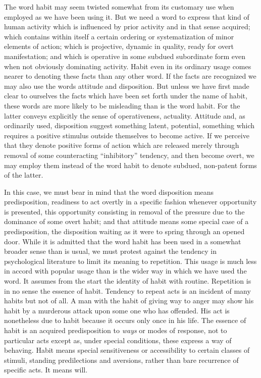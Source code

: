 \documentclass[12pt]{article}
\begin{document}
The word habit may seem twisted somewhat from
its customary use when employed as we have been using
it. But we need a word to express that kind of human
activity which is influenced by prior activity and in
that sense acquired; which contains within itself a certain
ordering or systematization of minor elements of
action; which is projective, dynamic in quality, ready
for overt manifestation; and which is operative in some
subdued subordinate form even when not obviously
dominating activity. Habit even in its ordinary usage
comes nearer to denoting these facts than any other
word. If the facts are recognized we may also use the
words attitude and disposition. But unless we have
first made clear to ourselves the facts which have been
set forth under the name of habit, these words are more
likely to be misleading than is the word habit. For the
latter conveys explicitly the sense of operativeness,
actuality. Attitude and, as ordinarily used, disposition
suggest something latent, potential, something which
requires a positive stimulus outside themselves to become
active. If we perceive that they denote positive
forms of action which are released merely through
removal of some counteracting ``inhibitory'' tendency,
and then become overt, we may employ them instead of
the word habit to denote subdued, non-patent forms of
the latter.

In this case, we must bear in mind that the word
disposition means predisposition, readiness to act
overtly in a specific fashion whenever opportunity is
presented, this opportunity consisting in removal of
the pressure due to the dominance of some overt habit;
and that attitude means some special case of a predisposition,
the disposition waiting as it were to spring
through an opened door. While it is admitted that the
word habit has been used in a somewhat broader sense
than is usual, we must protest against the tendency in
psychological literature to limit its meaning to repetition.
This usage is much less in accord with popular
usage than is the wider way in which we have used the
word. It assumes from the start the identity of habit
with routine. Repetition is in no sense the essence of
habit. Tendency to repeat acts is an incident of many
habits but not of all. A man with the habit of giving
way to anger may show his habit by a murderous attack
upon some one who has offended. His act is nonetheless
due to habit because it occurs only once in his life.
The essence of habit is an acquired predisposition to
\emph{ways} or modes of response, not to particular acts except
as, under special conditions, these express a way
of behaving. Habit means special sensitiveness or accessibility
to certain classes of stimuli, standing predilections
and aversions, rather than bare recurrence of
specific acts. It means will.
\end{document}
